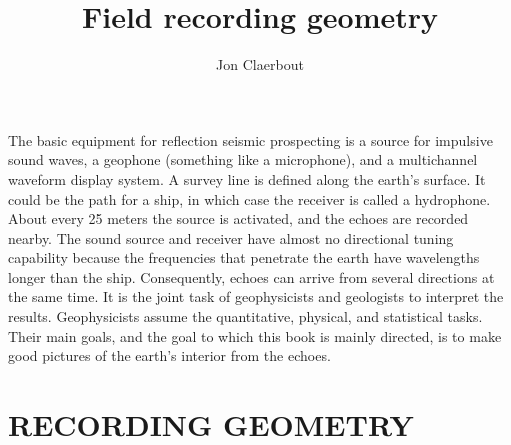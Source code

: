 \title{Field recording geometry}
\author{Jon Claerbout} 
\label{paper:fld}

\maketitle



\par
The basic equipment for reflection seismic prospecting
is a source for impulsive sound waves,
a geophone (something like a microphone),
and a multichannel waveform display system.
A survey line is defined along the earth's surface.
It could be the path for a ship,
in which case the receiver is called a hydrophone.
About every 25 meters the source is activated, and
the echoes are recorded nearby.
The sound source and receiver have almost no directional tuning capability
because the frequencies that penetrate the earth
have wavelengths longer than the ship.
Consequently, echoes can arrive from several directions at the same time.
It is the joint task of geophysicists and geologists
to interpret the results.
Geophysicists assume the quantitative, physical, and statistical tasks.
Their main goals, and the goal to which this
book is mainly directed, is to make good 
pictures of the earth's interior from the echoes.

\section{RECORDING GEOMETRY}

